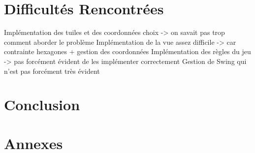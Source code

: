 \documentclass{article}
\begin{document}
    \section{Difficultés Rencontrées}\label{sec:difficultes-rencontrees}

    Implémentation des tuiles et des coordonnées choix -> on savait pas trop comment aborder le problème
    Implémentation de la vue assez difficile -> car contrainte hexagones + gestion des coordonnées
    Implémentation des règles du jeu -> pas forcément évident de les implémenter correctement
    Gestion de Swing qui n'est pas forcément très évident

    \section{Conclusion}\label{sec:conclusion}

    \section{Annexes}\label{sec:annexes}



    \tableofcontents
\end{document}
